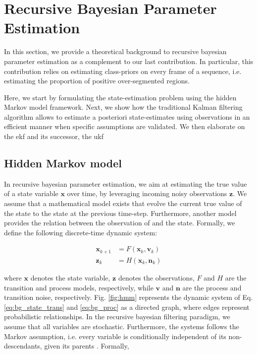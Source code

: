 \section{Recursive Bayesian Parameter Estimation}
In this section, we provide a theoretical background to recursive bayesian parameter estimation as a complement to our last contribution.
In particular, this contribution relies on estimating class-priors on every frame of a sequence, i.e. estimating the proportion of positive over-segmented regions.

Here, we start by formulating the state-estimation problem using the hidden Markov model framework.
Next, we show how the traditional Kalman filtering algorithm \cite{kalman1960} allows to estimate a posteriori state-estimates using observations in an efficient manner when specific assumptions are validated.
We then elaborate on the \gls{ekf} and its successor, the \gls{ukf}

\subsection{Hidden Markov model}
In recursive bayesian parameter estimation, we aim at estimating the true value of a state variable $\bm{x}$ over time, by leveraging incoming noisy observations $\bm{z}$.
We assume that a mathematical model exists that evolve the current true value of the state to the state at the previous time-step.
Furthermore, another model provides the relation between the observation of and the state.
Formally, we define the following discrete-time dynamic system:

\begin{align}
  \bm{x}_{k+1}&=F(\bm{x}_{k},\bm{v}_{k}) \label{eq:bg_state_trans}\\
  \bm{z}_{k}&= H(\bm{x}_{k}, \bm{n}_{k}) \label{eq:bg_proc}
\end{align}

where $\bm{x}$ denotes the state variable, $\bm{z}$ denotes the observations,
$F$ and $H$ are the transition and process models, respectively, while $\bm{v}$ and $\bm{n}$ are the process and transition noise, respectively.
Fig. \ref{fig:hmm} represents the dynamic system of Eq. \ref{eq:bg_state_trans} and \ref{eq:bg_proc} as a directed graph, where edges represent probabilistic relationships.
In the recursive bayesian filtering paradigm, we assume that all variables are stochastic.
Furthermore, the systems follows the Markov assumption, i.e. every variable is conditionally independent of its non-descendants, given its parents \cite{geiger90}.
Formally,

